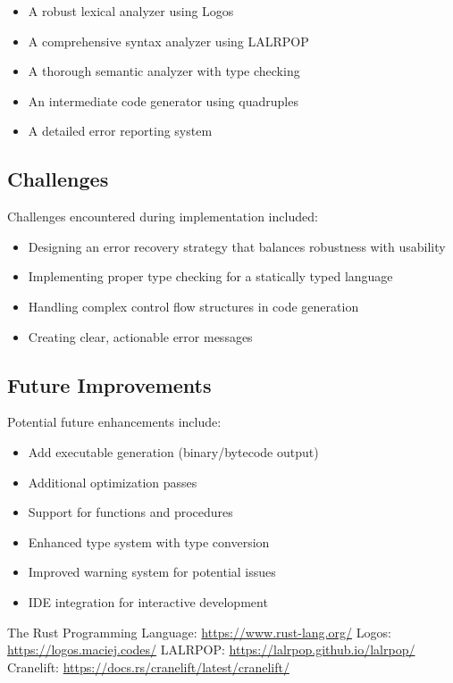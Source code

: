 \documentclass[12pt,a4paper]{article}
\begin{document}
\begin{itemize}
	\item A robust lexical analyzer using Logos
	\item A comprehensive syntax analyzer using LALRPOP
	\item A thorough semantic analyzer with type checking
	\item An intermediate code generator using quadruples
	\item A detailed error reporting system
\end{itemize}

\subsection{Challenges}
Challenges encountered during implementation included:
\begin{itemize}
	\item Designing an error recovery strategy that balances robustness with usability
	\item Implementing proper type checking for a statically typed language
	\item Handling complex control flow structures in code generation
	\item Creating clear, actionable error messages
\end{itemize}

\subsection{Future Improvements}
Potential future enhancements include:
\begin{itemize}
	\item Add executable generation (binary/bytecode output)
	\item Additional optimization passes
	\item Support for functions and procedures
	\item Enhanced type system with type conversion
	\item Improved warning system for potential issues
	\item IDE integration for interactive development
\end{itemize}


\begin{thebibliography}{9}
	 The Rust Programming Language: \url{https://www.rust-lang.org/}
	 Logos: \url{https://logos.maciej.codes/}
	 LALRPOP: \url{https://lalrpop.github.io/lalrpop/}
	 Cranelift: \url{https://docs.rs/cranelift/latest/cranelift/}
\end{thebibliography}
\end{document}
